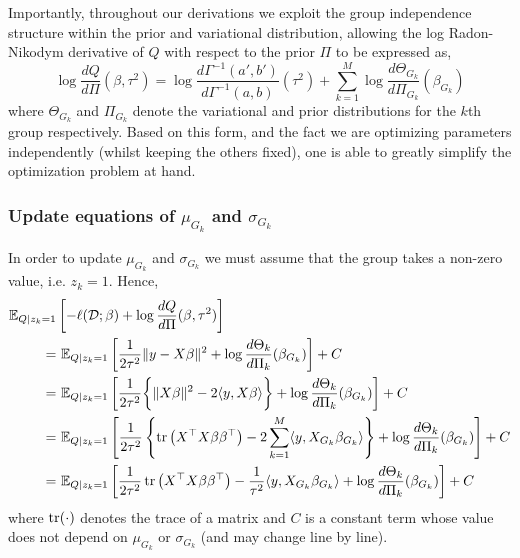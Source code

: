 Importantly, throughout our derivations we exploit the group independence structure within the prior and variational distribution, allowing the log Radon-Nikodym derivative of $Q$ with respect to the prior $\Pi$ to be expressed as,
\begin{equation}
    \log \frac{dQ}{d\Pi}(\beta, \tau^2) = 
	\log \frac{d\Gamma^{-1}(a', b')}{d \Gamma^{-1}(a, b)}(\tau^2) +
	\sum_{k=1}^{M} \log \frac{d\Theta_{G_k}}{d\Pi_{G_k}} (\beta_{G_k}) 
\end{equation}
where $\Theta_{G_k}$ and $\Pi_{G_k}$ denote the variational and prior distributions for the $k$th group respectively. Based on this form, and the fact we are optimizing parameters independently (whilst keeping the others fixed), one is able to greatly simplify the optimization problem at hand.



\subsubsection{Update equations of $\mu_{G_k}$ and $\sigma_{G_k}$}

In order to update $\mu_{G_k}$ and $\sigma_{G_k}$ we must assume that the group takes a non-zero value, i.e. $z_k =1$. Hence, %
{\allowdisplaybreaks
\begin{align}
\mathbb{E}_{Q  | z_k = 1} & \left[ 
    - \ell(\mathcal{D}; \beta) + \log \frac{dQ}{d\Pi}(\beta, \tau^2) 
\right]  \nonumber \\
= &\
    \mathbb{E}_{Q | z_k = 1} \left[ 
	\frac{1}{2\tau^2} \| y - X \beta \|^2
	+ \log \frac{d\Theta_k}{d\Pi_k}(\beta_{G_k})
    \right] + C \nonumber \\
= &\
    \mathbb{E}_{Q | z_k = 1} \left[ 
	\frac{1}{2\tau^2} \bigg\{ 
	    \| X \beta \|^2 - 2 \langle y, X\beta \rangle 
	\bigg\}
	+ \log \frac{d\Theta_k}{d\Pi_k}(\beta_{G_k})
    \right] + C \nonumber \\
= &\
    \mathbb{E}_{Q | z_k = 1} \left[ 
	\frac{1}{2\tau^2} \left\{ 
	    \operatorname{tr} \left( X^\top X \beta \beta^\top \right) 
	    - 2 \sum_{k=1}^M \langle y, X_{G_k} \beta_{G_k} \rangle 
	\right\}
	+ \log \frac{d\Theta_k}{d\Pi_k}(\beta_{G_k})
    \right] + C \nonumber \\
= &\
    \mathbb{E}_{Q | z_k = 1} \left[ 
	\frac{1}{2\tau^2} \operatorname{tr} \left( X^\top X \beta \beta^\top \right) 
	- \frac{1}{\tau^2} \langle y, X_{G_k} \beta_{G_k} \rangle 
	+ \log \frac{d\Theta_k}{d\Pi_k}(\beta_{G_k})
    \right] + C \label{eq:mu_sigma_1}
\end{align}
} %
where $\operatorname{tr}(\cdot)$ denotes the trace of a matrix and $C$ is a constant term whose value does not depend on $\mu_{G_k}$ or $\sigma_{G_k}$ (and may change line by line).

